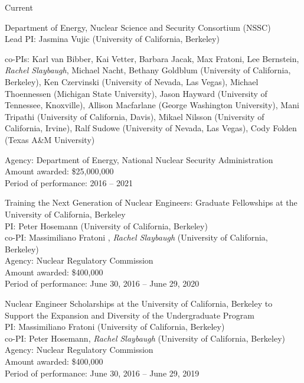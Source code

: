 \begin{rSubsection}{Current}{}{}{}
\vspace*{0.3 em}
\item Department of Energy, Nuclear Science and Security Consortium (NSSC)\\
Lead PI: Jasmina Vujic (University of California, Berkeley)
\vspace*{-.6 em}
\begin{addmargin}[1em]{0 em}
co-PIs: Karl van Bibber, Kai Vetter, Barbara Jacak, Max Fratoni, Lee Bernstein, \textit{Rachel Slaybaugh}, Michael Nacht, Bethany Goldblum (University of California, Berkeley), Ken Czervinski (University of Nevada, Las Vegas), Michael Thoennessen (Michigan State University), Jason Hayward (University of Tennessee, Knoxville), Allison Macfarlane (George Washington University), Mani Tripathi (University of California, Davis), Mikael Nilsson (University of California, Irvine), Ralf Sudowe (University of Nevada, Las Vegas), Cody Folden (Texas A\&M University)
\end{addmargin}
\vspace*{-.6 em}
Agency:  Department of Energy, National Nuclear Security Administration\\
Amount awarded: \$25,000,000\\
Period of performance: 2016 -- 2021

\vspace*{0.3 em}
\item Training the Next Generation of Nuclear Engineers: Graduate Fellowships at the University of California, Berkeley	\\
PI: Peter Hosemann (University of California, Berkeley) \\
\hspace*{1 em} co-PI: Massimiliano Fratoni , \textit{Rachel Slaybaugh} (University of California, Berkeley)\\
Agency: Nuclear Regulatory Commission \\
Amount awarded: \$400,000\\
Period of performance: June 30, 2016 -- June 29, 2020

\vspace*{0.3 em}
\item Nuclear Engineer Scholarships at the University of California, Berkeley to Support the Expansion and Diversity of the Undergraduate Program	\\
PI: Massimiliano Fratoni (University of California, Berkeley) \\
\hspace*{1 em} co-PI: Peter Hosemann, \textit{Rachel Slaybaugh} (University of California, Berkeley)\\
Agency: Nuclear Regulatory Commission \\
Amount awarded: \$400,000\\
Period of performance: June 30, 2016 -- June 29, 2019
\end{rSubsection}

